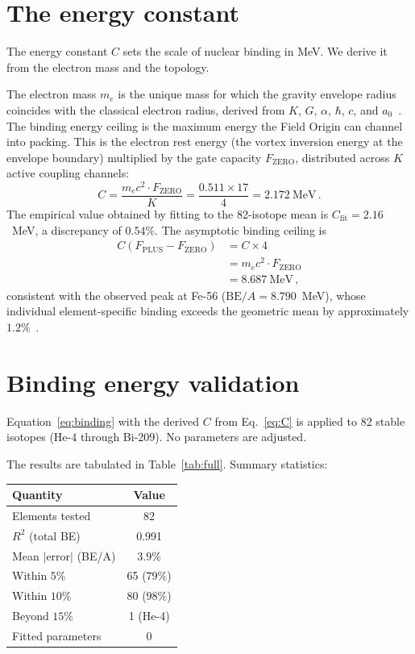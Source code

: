 \documentclass[twocolumn]{iopjournal}
\newcommand{\FZERO}{F_{\mathrm{ZERO}}}
\newcommand{\FPLUS}{F_{\mathrm{PLUS}}}
\newcommand{\BEA}{\mathrm{BE}/A}
\begin{document}
\section{The energy constant}

The energy constant $C$ sets the scale of nuclear binding in MeV.
We derive it from the electron mass and the topology.

The electron mass $m_e$ is the unique mass for which the gravity
envelope radius coincides with the classical electron radius,
derived from $K$, $G$, $\alpha$, $\hbar$, $c$, and
$a_0$~\cite{nelson2025a}.
The binding energy ceiling is the maximum energy the Field Origin
can channel into packing.
This is the electron rest energy (the vortex inversion energy
at the envelope boundary) multiplied by the gate capacity $\FZERO$,
distributed across $K$ active coupling channels:
\begin{equation}
  C = \frac{m_e c^2 \cdot \FZERO}{K}
    = \frac{0.511 \times 17}{4}
    = 2.172~\text{MeV}\,.
  \label{eq:C}
\end{equation}
The empirical value obtained by fitting to the 82-isotope mean
is $C_{\mathrm{fit}} = 2.16$~MeV, a discrepancy of $0.54\%$.
The asymptotic binding ceiling is
\begin{align}
  C(\FPLUS {-} \FZERO) &= C \times 4 \nonumber\\
  &= m_e c^2 \!\cdot\! \FZERO \nonumber\\
  &= 8.687~\text{MeV}\,,
\end{align}
consistent with the observed peak at Fe-56 ($\BEA = 8.790$~MeV),
whose individual element-specific binding exceeds the geometric
mean by approximately $1.2\%$~\cite{nelson2025b}.


\section{Binding energy validation}

Equation~\eqref{eq:binding} with the derived $C$ from
Eq.~\eqref{eq:C} is applied to 82 stable isotopes
(He-4 through Bi-209). No parameters are adjusted.

The results are tabulated in Table~\ref{tab:full}.
Summary statistics:
\begin{center}
\small
\begin{tabular}{lc}
\toprule
Quantity & Value \\
\midrule
Elements tested & 82 \\
$R^2$ (total BE) & 0.991 \\
Mean $|\mathrm{error}|$ (BE/A) & $3.9\%$ \\
Within $5\%$ & 65 ($79\%$) \\
Within $10\%$ & 80 ($98\%$) \\
Beyond $15\%$ & 1 (He-4) \\
Fitted parameters & 0 \\
\bottomrule
\end{tabular}
\end{center}
\end{document}
